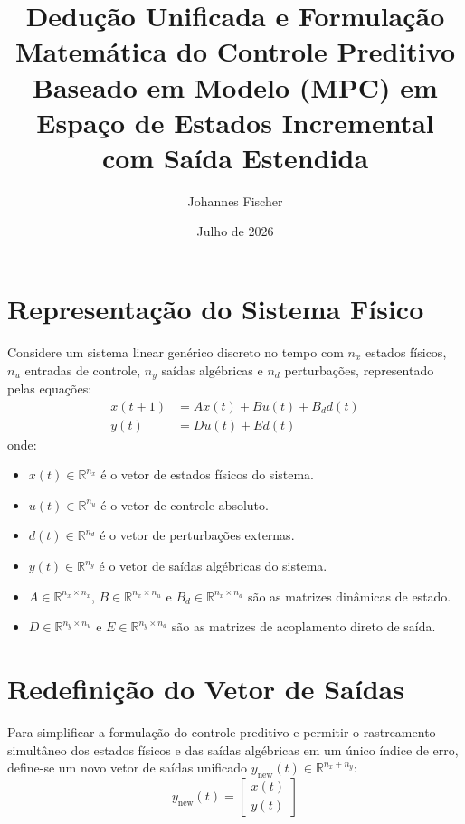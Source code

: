 \documentclass[12pt]{article}
\title{Dedução Unificada e Formulação Matemática do Controle Preditivo Baseado em Modelo (MPC) em Espaço de Estados Incremental com Saída Estendida}
\author{Johannes Fischer}
\date{Julho de 2026}
\begin{document}
\maketitle

\section{Representação do Sistema Físico}

Considere um sistema linear genérico discreto no tempo com $n_x$ estados físicos, $n_u$ entradas de controle, $n_y$ saídas algébricas e $n_d$ perturbações, representado pelas equações:
\begin{subequations}
\label{eq:sistema_fisico}
\begin{align}
x(t+1) &= A x(t) + B u(t) + B_d d(t) \\
y(t) &= D u(t) + E d(t)
\end{align}
\end{subequations}
onde:
\begin{itemize}
    \item $x(t) \in \mathbb{R}^{n_x}$ é o vetor de estados físicos do sistema.
    \item $u(t) \in \mathbb{R}^{n_u}$ é o vetor de controle absoluto.
    \item $d(t) \in \mathbb{R}^{n_d}$ é o vetor de perturbações externas.
    \item $y(t) \in \mathbb{R}^{n_y}$ é o vetor de saídas algébricas do sistema.
    \item $A \in \mathbb{R}^{n_x \times n_x}$, $B \in \mathbb{R}^{n_x \times n_u}$ e $B_d \in \mathbb{R}^{n_x \times n_d}$ são as matrizes dinâmicas de estado.
    \item $D \in \mathbb{R}^{n_y \times n_u}$ e $E \in \mathbb{R}^{n_y \times n_d}$ são as matrizes de acoplamento direto de saída.
\end{itemize}

\section{Redefinição do Vetor de Saídas}

Para simplificar a formulação do controle preditivo e permitir o rastreamento simultâneo dos estados físicos e das saídas algébricas em um único índice de erro, define-se um novo vetor de saídas unificado $y_{\text{new}}(t) \in \mathbb{R}^{n_x + n_y}$:
\begin{equation}
y_{\text{new}}(t) = \begin{bmatrix} x(t) \\ y(t) \end{bmatrix}
\end{equation}
\end{document}

